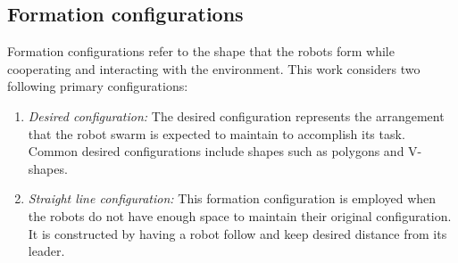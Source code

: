 \subsection{Formation configurations}\label{sec:config}
Formation configurations refer to the shape that the robots form while cooperating and interacting with the environment. This work considers two following primary configurations:
\begin{enumerate}
    \item \textit{Desired configuration:} The desired configuration represents the arrangement that the robot swarm is expected to maintain to accomplish its task. Common desired configurations include shapes such as polygons and V-shapes.
    \item \textit{Straight line configuration:} This formation configuration is employed when the robots do not have enough space to maintain their original configuration. It is constructed by having a robot follow and keep desired distance from its leader.
\end{enumerate}